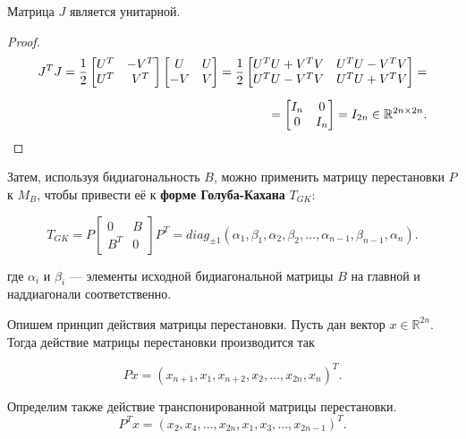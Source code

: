 \begin{claim}
    Матрица \(J\) является унитарной.
\end{claim}
\begin{proof}
    \begin{equation*}
        \begin{split}
            J^T J= \frac{1}{2} \begin{bmatrix} U^T &-V^T\\ U^T & V^T \end{bmatrix} \begin{bmatrix} U & U \\ -V & V \end{bmatrix} = \frac{1}{2} \begin{bmatrix}
        U^TU+V^TV & U^TU-V^TV \\ U^TU-V^TV & U^TU+V^TV
    \end{bmatrix} =\\[6pt] = \begin{bmatrix}
        I_n & 0 \\ 0 & I_n
    \end{bmatrix} = I_{2n} \in \mathbb{R}^{2n \times 2n}.
        \end{split}
    \end{equation*}
\end{proof}

Затем, используя бидиагональность \( B \), можно применить матрицу перестановки \( P \) к \( M_B \), чтобы привести её к \textbf{форме Голуба-Кахана} \( T_{GK} \):

\begin{equation}
T_{GK} = P \begin{bmatrix} 0 & B \\ B^T & 0 \end{bmatrix} P^T = diag_{\pm 1}(\alpha_1,\beta_1,\alpha_2,\beta_2,\dots,\alpha_{n-1},\beta_{n-1},\alpha_{n}).
\end{equation}

где \( \alpha_i \) и \( \beta_i \) — элементы исходной бидиагональной матрицы \( B \) на главной и наддиагонали соответственно. 

Опишем принцип действия матрицы перестановки. Пусть дан вектор \(x \in \mathbb{R}^{2n} \). Тогда действие матрицы перестановки производится так

\begin{equation}
    Px=(x_{n+1},x_1, x_{n+2},x_2,\dots,x_{2n},x_n)^T.
\end{equation}
\begin{note}
    Определим также действие транспонированной матрицы перестановки.
    \begin{equation}
        P^Tx=(x_2,x_4,\dots,x_{2n},x_1,x_3,\dots,x_{2n-1})^T.
    \end{equation}
\end{note}

